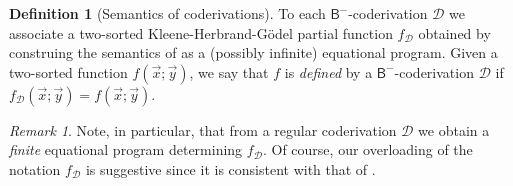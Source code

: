 \documentclass[manuscript,screen]{acmart}
\theoremstyle{definition}
\newtheorem{defn}[thm]{Definition}
\theoremstyle{remark}
\newtheorem{rem}[thm]{Remark}
\newcommand{\denot}[1]{f_{#1}}
\newcommand{\bc}{\mathsf{B}}
\newcommand{\bcnorec}{\bc^{-}}
\newcommand{\der}{\mathcal{D}}
\begin{document}
\begin{defn}
[Semantics of coderivations]
\label{defn:semantics-coderivations}
To each $\bcnorec$-coderivation $\der$ we associate a two-sorted Kleene-Herbrand-G\"odel partial function $\denot \der$ obtained by construing the semantics of  as a (possibly infinite) equational program.
% 
Given a two-sorted function $f(\vec x; \vec y)$, we say that $f$ is \emph{defined} by a $\bcnorec$-coderivation $\der$ if $\denot\der(\vec x; \vec y)=f(\vec x; \vec y)$. 
\end{defn}



\begin{rem}\label{rem:regular-finite-equation}
Note, in particular, that from a regular coderivation $\der$ we obtain a \emph{finite} equational program determining $\denot \der$.
Of course, our overloading of the notation $\denot \der$ is suggestive since it is consistent with that of .
\end{rem}
\end{document}
